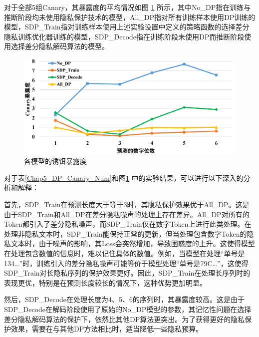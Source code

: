 对于全部5组Canary，其暴露度的平均情况如图 \ref{Chap5_DP_Canary_Res} 所示，其中No\_DP指在训练与推断阶段均未使用隐私保护技术的模型，All\_DP指对所有训练样本使用DP训练的模型，SDP\_Train指对训练样本使用上述实验设置中定义的策略函数的选择差分隐私训练优化器训练的模型，SDP\_Decode指在训练阶段未使用DP而推断阶段使用选择差分隐私解码算法的模型。

\begin{figure}[h]
	\centering
	\includegraphics[width=\linewidth]{figures/Chap5_DP_Canary_Res.png}
	\caption{各模型的诱饵暴露度}
	\label{Chap5_DP_Canary_Res}
\end{figure}



对于表\ref{Chap5_DP_Canary_Num}和图\ref{Chap5_DP_Canary_Res} 中的实验结果，可以进行以下深入的分析和解释：

首先，SDP\_Train在预测长度大于等于3时，其隐私保护效果优于All\_DP。这是由于SDP\_Train和All\_DP在差分隐私噪声的处理上存在差异。All\_DP对所有的Token都引入了差分隐私噪声，而SDP\_Train仅在数字Token上进行此类处理。在处理非隐私文本时，SDP\_Train能保持正常的更新，但当处理包含数字Token的隐私文本时，由于噪声的影响，其Loss会突然增加，导致困惑度的上升。这使得模型在处理包含数值的信息时，难以记住具体的数值。例如，当模型在处理“单号是134…”时，训练引入的差分隐私噪声可能等价于模型处理“单号是79C…”，这使得SDP\_Train对长隐私序列的保护效果更好。因此，SDP\_Train在处理长序列时的表现更优，特别是在预测长度较长的情况下，这种优势更加明显。

然后，SDP\_Decode在处理长度为4、5、6的序列时，其暴露度较高。这是由于SDP\_Decode在解码阶段使用了原始的No\_DP模型的参数，其记忆性问题在选择差分隐私解码算法的保护下，依然比其他DP算法更突出。为了获得更好的隐私保护效果，需要在与其他DP方法相比时，适当降低一些隐私预算。

